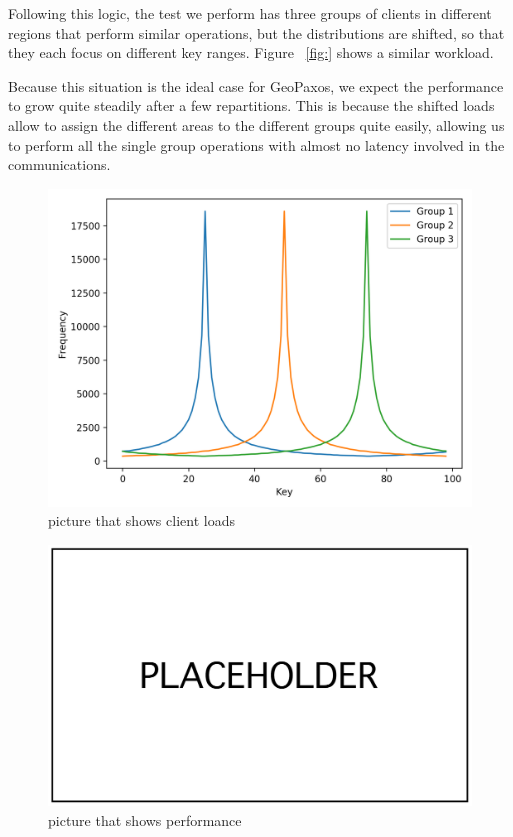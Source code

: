 Following this logic, the test we perform has three groups of clients in different regions that perform similar operations, but the distributions are shifted, so that they each focus on different key ranges. Figure ~\ref{fig:} shows a similar workload.

Because this situation is the ideal case for GeoPaxos, we expect the performance to grow quite steadily after a few repartitions. This is because the shifted loads allow to assign the different areas to the different groups quite easily, allowing us to perform all the single group operations with almost no latency involved in the communications.

\begin{figure}[!htb]
  \centering
  \includegraphics[width=\textwidth,height=\textheight,keepaspectratio]{img/clients_loads.png}
  \caption[caption]{ picture that shows client loads }
  \label{fig:local-skewed-loads}
\end{figure}

\begin{figure}[!htb]
  \centering
  \includegraphics[width=\textwidth,height=\textheight,keepaspectratio]{img/placeholder.png}
  \caption[caption]{ picture that shows performance }
  \label{fig:local-skewed-performance}
\end{figure}

